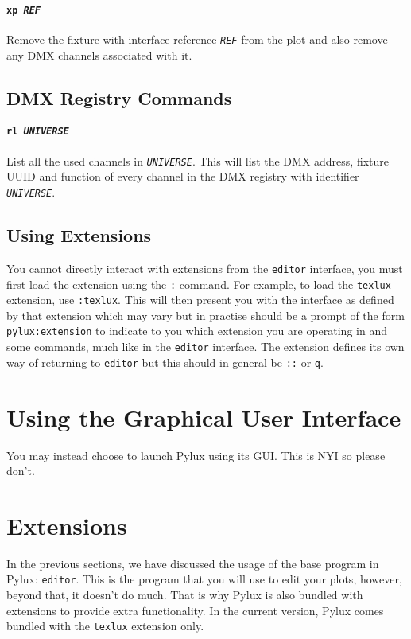 \documentclass[a4paper]{article}
\begin{document}
\paragraph{\texttt{xp \textit{REF}}}
Remove the fixture with interface reference \texttt{\textit{REF}} from the 
plot and also remove any DMX channels associated with it.

\subsection{DMX Registry Commands}

\paragraph{\texttt{rl \textit{UNIVERSE}}}
List all the used channels in \texttt{\textit{UNIVERSE}}. This will list the 
DMX address, fixture UUID and function of every channel in the DMX registry 
with identifier \texttt{\textit{UNIVERSE}}.

\subsection{Using Extensions}
You cannot directly interact with extensions from the \texttt{editor} 
interface, you must first load the extension using the \texttt{:} command.
For example, to load the \texttt{texlux} extension, use \texttt{:texlux}. 
This will then present you with the interface as defined by that extension 
which may vary but in practise should be a prompt of the form 
\texttt{pylux:extension} to indicate to you which extension you are 
operating in and some commands, much like in the \texttt{editor} interface.
The extension defines its own way of returning to \texttt{editor} but this 
should in general be \texttt{::} or \texttt{q}.

\section{Using the Graphical User Interface}
You may instead choose to launch Pylux using its GUI. This is NYI so please 
don't.

\section{Extensions}
In the previous sections, we have discussed the usage of the base program in 
Pylux: \texttt{editor}. This is the program that you will use to edit your
plots, however, beyond that, it doesn't do much. That is why Pylux is also 
bundled with extensions to provide extra functionality. In the current 
version, Pylux comes bundled with the \texttt{texlux} extension only.
\end{document}
